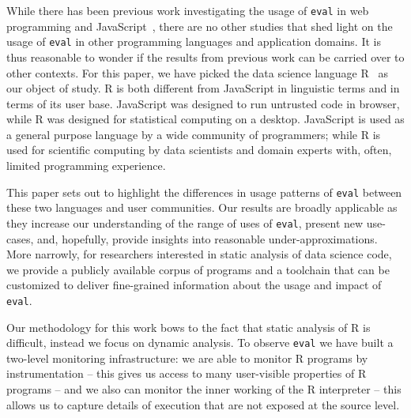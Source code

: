 \documentclass[USenglish,cleveref, autoref, thm-restate]{lipics-v2019}
\newcommand{\eval}{\texttt{eval}\xspace}
\begin{document}
While there has been previous work investigating the usage of \eval in web
programming and JavaScript~\cite{ecoop11}, there are no other studies that
shed light on the usage of \eval in other programming languages and
application domains.  It is thus reasonable to wonder if the results from
previous work can be carried over to other contexts. For this paper, we have
picked the data science language R~\cite{r} as our object of study. R is
both different from JavaScript in linguistic terms and in terms of its user
base. JavaScript was designed to run untrusted code in browser, while R was
designed for statistical computing on a desktop. JavaScript is used as a
general purpose language by a wide community of programmers; while R is used
for scientific computing by data scientists and domain experts with, often,
limited programming experience.

This paper sets out to highlight the differences in usage patterns of \eval
between these two languages and user communities. Our results are broadly
applicable as they increase our understanding of the range of uses of \eval,
present new use-cases, and, hopefully, provide insights into reasonable
under-approximations. More narrowly, for researchers interested in static
analysis of data science code, we provide a publicly available corpus of
programs and a toolchain that can be customized to deliver fine-grained
information about the usage and impact of \eval.

Our methodology for this work bows to the fact that static analysis of R is
difficult, instead we focus on dynamic analysis. To observe \eval we have
built a two-level monitoring infrastructure: we are able to monitor R
programs by instrumentation -- this gives us access to many user-visible
properties of R programs -- and we also can monitor the inner working of the
R interpreter -- this allows us to capture details of execution that are not
exposed at the source level.
\end{document}
